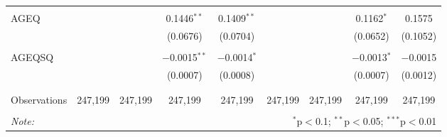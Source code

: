 \begin{table}[!htbp]
\begin{tabular}{@{\extracolsep{5pt}}lcccccccc}
  & & & & & & & & \\ 
 AGEQ &  &  & 0.1446$^{**}$ & 0.1409$^{**}$ &  &  & 0.1162$^{*}$ & 0.1575 \\ 
  &  &  & (0.0676) & (0.0704) &  &  & (0.0652) & (0.1052) \\ 
  & & & & & & & & \\ 
 AGEQSQ &  &  & $-$0.0015$^{**}$ & $-$0.0014$^{*}$ &  &  & $-$0.0013$^{*}$ & $-$0.0015 \\ 
  &  &  & (0.0007) & (0.0008) &  &  & (0.0007) & (0.0012) \\ 
  & & & & & & & & \\ 
\hline \\[-1.8ex] 
Observations & 247,199 & 247,199 & 247,199 & 247,199 & 247,199 & 247,199 & 247,199 & 247,199 \\ 
\hline 
\hline \\[-1.8ex] 
\textit{Note:}  & \multicolumn{8}{r}{$^{*}$p$<$0.1; $^{**}$p$<$0.05; $^{***}$p$<$0.01} \\ 
\end{tabular} 
\end{table} 

